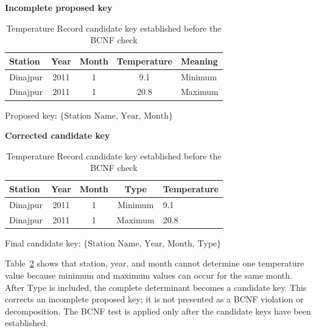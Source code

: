 \begin{table}[H]
\centering
\caption{Temperature Record candidate key established before the BCNF check}
\label{tab:bcnf-example}
\small
\renewcommand{\arraystretch}{1.2}

\textbf{Incomplete proposed key}\\[2mm]

\begin{tabular}{@{}lcccl@{}}
\toprule
\textbf{Station} &
\textbf{Year} &
\textbf{Month} &
\textbf{Temperature} &
\textbf{Meaning} \\
\midrule
Dinajpur & 2011 & 1 & 9.1  & Minimum \\
Dinajpur & 2011 & 1 & 20.8 & Maximum \\
\bottomrule
\end{tabular}

\vspace{2mm}

\begin{flushleft}
Proposed key:
\(\{\text{Station Name, Year, Month}\}\)
\end{flushleft}

\vspace{3mm}

\textbf{Corrected candidate key}\\[2mm]

\begin{tabular}{@{}lcccl@{}}
\toprule
\textbf{Station} &
\textbf{Year} &
\textbf{Month} &
\textbf{Type} &
\textbf{Temperature} \\
\midrule
Dinajpur & 2011 & 1 & Minimum & 9.1 \\
Dinajpur & 2011 & 1 & Maximum & 20.8 \\
\bottomrule
\end{tabular}

\vspace{2mm}

\begin{flushleft}
Final candidate key:
\(\{\text{Station Name, Year, Month, Type}\}\)
\end{flushleft}
\end{table}

Table~\ref{tab:bcnf-example} shows that station, year, and month cannot
determine one temperature value because minimum and maximum values can occur
for the same month. After Type is included, the complete determinant becomes
a candidate key. This corrects an incomplete proposed key; it is not presented
as a BCNF violation or decomposition. The BCNF test is applied only after the
candidate keys have been established.


